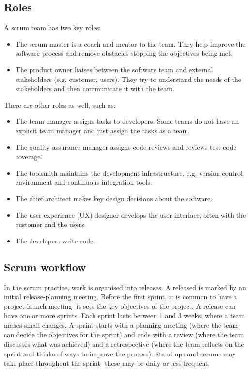 \documentclass[a4paper, openany]{memoir}
\begin{document}
\subsection{Roles}
A scrum team has two key roles:
\begin{itemize}
    \item The scrum master is a coach and mentor to the team. They help improve the software process and remove obstacles stopping the objectives being met.
    \item The product owner liaises between the software team and external stakeholders (e.g. customer, users). They try to understand the needs of the stakeholders and then communicate it with the team.
\end{itemize}
There are other roles as well, such as:
\begin{itemize}
    \item The team manager assigns tasks to developers. Some teams do not have an explicit team manager and just assign the tasks as a team.
    \item The quality assurance manager assigns code reviews and reviews test-code coverage.
    \item The toolsmith maintains the development infrastructure, e.g. version control environment and continuous integration tools.
    \item The chief architect makes key design decisions about the software.
    \item The user experience (UX) designer develops the user interface, often with the customer and the users.
    \item The developers write code.
\end{itemize}

\subsection{Scrum workflow}
In the scrum practice, work is organised into releases. A released is marked by an initial release-planning meeting. Before the first sprint, it is common to have a project-launch meeting- it sets the key objectives of the project. A release can have one or more sprints. Each sprint lasts between 1 and 3 weeks, where a team makes small changes. A sprint starts with a planning meeting (where the team can decide the objectives for the sprint) and ends with a review (where the team discusses what was achieved) and a retrospective (where the team reflects on the sprint and thinks of ways to improve the process). Stand ups and scrums may take place throughout the sprint- these may be daily or less frequent.
\end{document}
